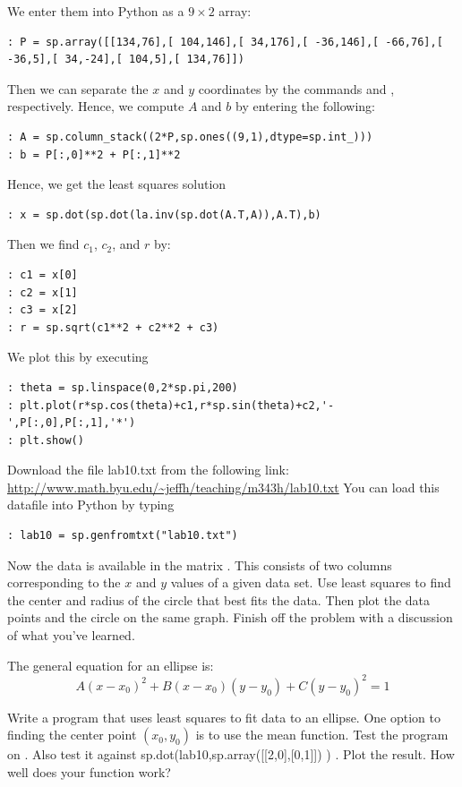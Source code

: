We enter them into Python as a $9\times 2$ array:
\begin{lstlisting}[style=python]
: P = sp.array([[134,76],[ 104,146],[ 34,176],[ -36,146],[ -66,76],[ -36,5],[ 34,-24],[ 104,5],[ 134,76]])
\end{lstlisting}
Then we can separate the $x$ and $y$ coordinates by the commands  and , respectively.  Hence, we compute $A$ and $b$ by entering the following:
\begin{lstlisting}[style=python]
: A = sp.column_stack((2*P,sp.ones((9,1),dtype=sp.int_)))
: b = P[:,0]**2 + P[:,1]**2
\end{lstlisting}
Hence, we get the least squares solution
\begin{lstlisting}[style=python]
: x = sp.dot(sp.dot(la.inv(sp.dot(A.T,A)),A.T),b)
\end{lstlisting}
Then we find $c_1$, $c_2$, and $r$ by:
\begin{lstlisting}[style=python]
: c1 = x[0]
: c2 = x[1]
: c3 = x[2]
: r = sp.sqrt(c1**2 + c2**2 + c3)
\end{lstlisting}
We plot this by executing
\begin{lstlisting}[style=python]
: theta = sp.linspace(0,2*sp.pi,200)
: plt.plot(r*sp.cos(theta)+c1,r*sp.sin(theta)+c2,'-',P[:,0],P[:,1],'*')
: plt.show()
\end{lstlisting}


\begin{problem}
Download the file lab10.txt from the following link:
\url{http://www.math.byu.edu/~jeffh/teaching/m343h/lab10.txt}
You can load this datafile into Python by typing
\begin{lstlisting}[style=python]
: lab10 = sp.genfromtxt("lab10.txt")
\end{lstlisting}
Now the data is available in the matrix .  This consists of two columns corresponding to the $x$ and $y$ values of a given data set.  Use least squares to find the center and radius of the circle that best fits the data.  Then plot the data points and the circle on the same graph.  Finish off the problem with a discussion of what you've learned.
\end{problem}

\begin{problem}
The general equation for an ellipse is:
\[
A(x-x_0)^2 + B(x-x_0)(y-y_0) + C(y-y_0)^2 = 1
\]

Write a program that uses least squares to fit data to an ellipse. One option to finding the center point $(x_0,y_0)$ is to use the mean function. Test the program on . Also test it against sp.dot(lab10,sp.array([[2,0],[0,1]]) ) . Plot the result. How well does your function work?
\end{problem}
